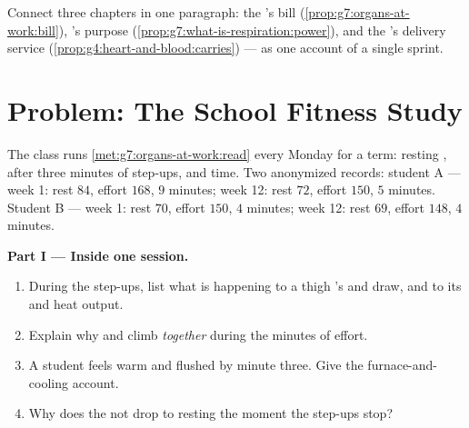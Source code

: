 \begin{exercise}[$\star\star\star$]\label{exo:g7:organs-at-work:12}
Connect three chapters in one paragraph: the 's
bill (\cref{prop:g7:organs-at-work:bill}), 's
purpose (\cref{prop:g7:what-is-respiration:power}), and
the 's delivery service
(\cref{prop:g4:heart-and-blood:carries}) --- as one
account of a single sprint.
\end{exercise}

\section{Problem: The School Fitness Study}

\begin{problem}\label{pb:g7:organs-at-work:1}
The class runs \cref{met:g7:organs-at-work:read} every
Monday for a term: resting ,  after three
minutes of step-ups, and  time. Two anonymized
records: student A --- week 1: rest $84$, effort $168$,
 $9$ minutes; week 12: rest $72$, effort $150$,
 $5$ minutes. Student B --- week 1: rest $70$,
effort $150$,  $4$ minutes; week 12: rest $69$,
effort $148$,  $4$ minutes.

\medskip\noindent\textbf{Part I --- Inside one session.}
\begin{enumerate}
  \item During the step-ups, list what is happening to a
        thigh 's  and  draw, and to
        its  and heat output.
  \item Explain why  and  climb
        \emph{together} during the minutes of effort.
  \item A student feels warm and flushed by minute three.
        Give the furnace-and-cooling account.
  \item Why does the  not drop to resting the moment
        the step-ups stop?
\end{enumerate}


\end{problem}

